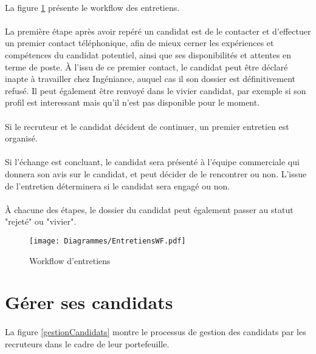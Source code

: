 \paragraph{} La figure \ref{entretiens} présente le workflow des entretiens.
\paragraph{} La première étape après avoir repéré un candidat est de le contacter et d'effectuer un premier contact téléphonique, afin de mieux cerner les expériences et compétences du candidat potentiel, ainsi que ses disponibilités et attentes en terme de poste. À l'issu de ce premier contact, le candidat peut être déclaré inapte à travailler chez Ingéniance, auquel cas il son dossier est définitivement refusé. Il peut également être renvoyé dans le vivier candidat, par exemple si son profil est interessant mais qu'il n'est pas disponible pour le moment. 
\paragraph{} Si le recruteur et le candidat décident de continuer, un premier entretien est organisé. 
\paragraph{} Si l'échange est concluant, le candidat sera présenté à l'équipe commerciale qui donnera son avis sur le candidat, et peut décider de le rencontrer ou non. L'issue de l'entretien déterminera si le candidat sera engagé ou non. 
\paragraph{}À chacune des étapes, le dossier du candidat peut également passer au statut "rejeté" ou "vivier".


\begin{figure}
	\centering
	\begin{sideways}
	\texttt{[image: Diagrammes/EntretiensWF.pdf]}
	\end{sideways}
	\caption{Workflow d'entretiens}
	\label{entretiens}	
\end{figure}

\section{Gérer ses candidats}

\paragraph{} La figure \ref{gestionCandidats} montre le processus de gestion des candidats par les recruteurs dans le cadre de leur portefeuille.
